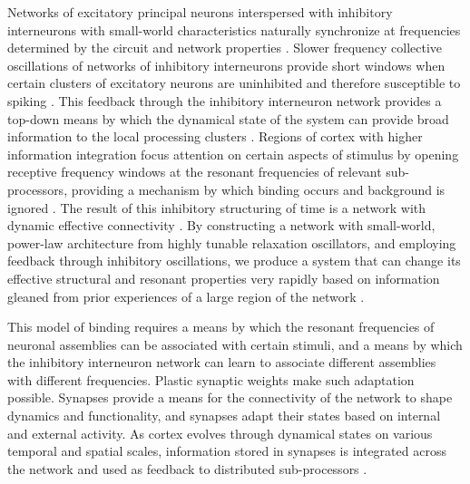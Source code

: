 \documentclass[twocolumn]{article}
\begin{document}
Networks of excitatory principal neurons interspersed with inhibitory interneurons \cite{robu2015} with small-world characteristics naturally synchronize at frequencies determined by the circuit and network properties \cite{bu2006}. Slower frequency collective oscillations of networks of inhibitory interneurons provide short windows when certain clusters of excitatory neurons are uninhibited and therefore susceptible to spiking \cite{buge2004}. This feedback through the inhibitory interneuron network provides a top-down means by which the dynamical state of the system can provide broad information to the local processing clusters \cite{enfr2001,fr2015}. Regions of cortex with higher information integration focus attention \cite{vala2001} on certain aspects of stimulus by opening receptive frequency windows at the resonant frequencies of relevant sub-processors, providing a mechanism by which binding occurs and background is ignored \cite{lued1997,enfr2001,budr2004,fr2015}. The result of this inhibitory structuring of time is a network with dynamic effective connectivity \cite{brto2006,fr2015}. By constructing a network with small-world, power-law architecture from highly tunable relaxation oscillators, and employing feedback through inhibitory oscillations, we produce a system that can change its effective structural and resonant properties very rapidly based on information gleaned from prior experiences of a large region of the network \cite{budr2004,fr2015}.

This model of binding requires a means by which the resonant frequencies of neuronal assemblies can be associated with certain stimuli, and a means by which the inhibitory interneuron network can learn to associate different assemblies with different frequencies. Plastic synaptic weights make such adaptation possible. Synapses provide a means for the connectivity of the network to shape dynamics and functionality, and synapses adapt their states based on internal and external activity. As cortex evolves through dynamical states on various temporal and spatial scales, information stored in synapses is integrated across the network and used as feedback to distributed sub-processors \cite{enfr2001,fr2015}. 
\end{document}
